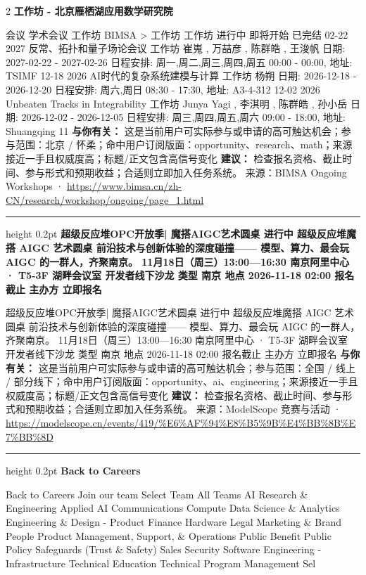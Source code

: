 \documentclass[10.5pt]{ctexart}
\begin{document}
\begin{multicols}{2}
{\large\bfseries 工作坊 - 北京雁栖湖应用数学研究院}\par
会议 学术会议 工作坊 BIMSA > 工作坊 工作坊 进行中 即将开始 已完结 02-22 2027 反常、拓扑和量子场论会议 工作坊 崔嵬 , 万喆彦 , 陈群皓 , 王浚帆 日期: 2027-02-22 - 2027-02-26 日程安排: 周一,周二,周三,周四,周五 00:00 - 00:00, 地址: TSIMF 12-18 2026 AI时代的复杂系统建模与计算 工作坊 杨朔 日期: 2026-12-18 - 2026-12-20 日程安排: 周六,周日 08:30 - 17:30, 地址: A3-4-312 12-02 2026 Unbeaten Tracks in Integrability 工作坊 Junya Yagi , 李淇明 , 陈群皓 , 孙小岳 日期: 2026-12-02 - 2026-12-05 日程安排: 周三,周四,周五,周六 09:00 - 18:00, 地址: Shuangqing 11
\textbf{与你有关：} 这是当前用户可实际参与或申请的高可触达机会；参与范围：北京 / 怀柔；命中用户订阅版面：opportunity、research、math；来源接近一手且权威度高；标题/正文包含高信号变化
\textbf{建议：} 检查报名资格、截止时间、参与形式和预期收益；合适则立即加入任务系统。
{\footnotesize\color{ormuted} 来源：BIMSA Ongoing Workshops · \url{https://www.bimsa.cn/zh-CN/research/workshop/ongoing/page_1.html}}
\vspace{2mm}
\hrule height 0.2pt
\vspace{2mm}
{\large\bfseries 超级反应堆OPC开放季| 魔搭AIGC艺术圆桌 进行中 超级反应堆魔搭 AIGC 艺术圆桌 前沿技术与创新体验的深度碰撞—— 模型、算力、最会玩 AIGC 的一群人，齐聚南京。 11月18日（周三）13:00—16:30 南京阿里中心 · T5-3F 湖畔会议室 开发者线下沙龙 类型 南京 地点 2026-11-18 02:00 报名截止 主办方 立即报名}\par
超级反应堆OPC开放季| 魔搭AIGC艺术圆桌 进行中 超级反应堆魔搭 AIGC 艺术圆桌 前沿技术与创新体验的深度碰撞—— 模型、算力、最会玩 AIGC 的一群人，齐聚南京。 11月18日（周三）13:00—16:30 南京阿里中心 · T5-3F 湖畔会议室 开发者线下沙龙 类型 南京 地点 2026-11-18 02:00 报名截止 主办方 立即报名
\textbf{与你有关：} 这是当前用户可实际参与或申请的高可触达机会；参与范围：全国 / 线上 / 部分线下；命中用户订阅版面：opportunity、ai、engineering；来源接近一手且权威度高；标题/正文包含高信号变化
\textbf{建议：} 检查报名资格、截止时间、参与形式和预期收益；合适则立即加入任务系统。
{\footnotesize\color{ormuted} 来源：ModelScope 竞赛与活动 · \url{https://modelscope.cn/events/419/%E6%AF%94%E8%B5%9B%E4%BB%8B%E7%BB%8D}}
\vspace{2mm}
\hrule height 0.2pt
\vspace{2mm}
{\large\bfseries Back to Careers}\par
Back to Careers Join our team Select Team All Teams AI Research \& Engineering Applied AI Communications Compute Data Science \& Analytics Engineering \& Design - Product Finance Hardware Legal Marketing \& Brand People Product Management, Support, \& Operations Public Benefit Public Policy Safeguards (Trust \& Safety) Sales Security Software Engineering - Infrastructure Technical Education Technical Program Management Sel

\end{multicols}
\end{document}
